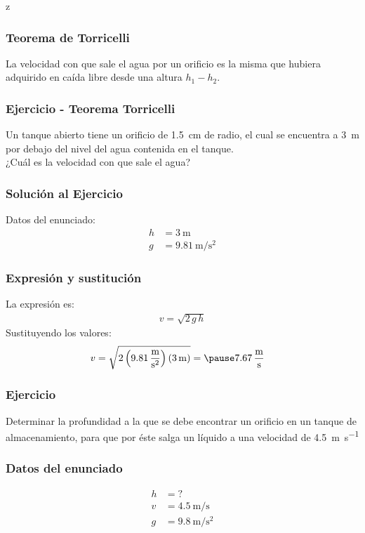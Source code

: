 z\documentclass[14pt]{beamer}
\begin{document}
\begin{frame}
\frametitle{Teorema de Torricelli}
La velocidad con que sale el agua por un orificio es la misma que hubiera adquirido en caída libre desde una altura $h_{1} - h_{2}$.
\end{frame}
\begin{frame}
\frametitle{Ejercicio - Teorema Torricelli}
Un tanque abierto tiene un orificio de \SI{1.5}{\centi\meter} de radio, el cual se encuentra a \SI{3}{\meter} por debajo del nivel del agua contenida en el tanque.
\\
\bigskip
\pause
¿Cuál es la velocidad con que sale el agua?
\end{frame}
\begin{frame}
\frametitle{Solución al Ejercicio}
Datos del enunciado:
\pause
\begin{align*}
h &= \SI{3}{\meter} \\[0.5em]
g &= \SI[per-mode=fraction]{9.81}{\meter\per\square\second}
\end{align*}
\end{frame}
\begin{frame}
\frametitle{Expresión y sustitución}
La expresión es:
\pause
\begin{align*}
v = \sqrt{ 2 \, g \, h}
\end{align*}
\pause
Sustituyendo los valores:
\pause
\begin{eqnarray*}
\begin{aligned}
v &= \sqrt{2 \left( \SI[per-mode=fraction]{9.81}{\meter\per\square\second} \right)\left( \SI{3}{\meter}  \right)} = \pause \SI[per-mode=fraction]{7.67}{\meter\per\second}
\end{aligned}
\end{eqnarray*}
\end{frame}
\begin{frame}
\frametitle{Ejercicio}
Determinar la profundidad a la que se debe encontrar un orificio en un tanque de almacenamiento, para que por éste salga un líquido a una velocidad de \SI[per-mode=symbol]{4.5}{\meter\per\second}
\end{frame}
\begin{frame}
\frametitle{Datos del enunciado}
\begin{align*}
h &= ? \\[0.5em]
v &= \SI[per-mode=symbol]{4.5}{\meter\per\second} \\[0.5em]
g &= \SI[per-mode=symbol]{9.8}{\meter\per\square\second}
\end{align*}
\end{frame}
\end{document}
